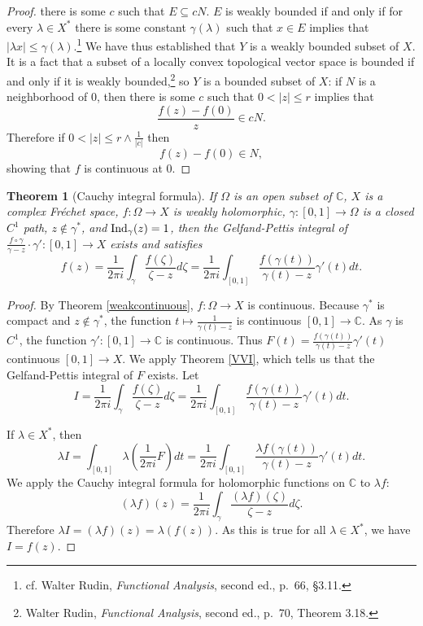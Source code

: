 \documentclass{article}
\newcommand{\Ind}{\ensuremath\mathrm{Ind}}
\newtheorem{theorem}{Theorem}
\theoremstyle{definition}
\begin{document}
\begin{proof}
there is some $c$ such that $E \subseteq cN$. $E$ is weakly bounded if and only if
for every $\lambda \in X^*$ there is some constant $\gamma(\lambda)$ such that $x \in E$ implies that 
$|\lambda x| \leq \gamma(\lambda)$.\footnote{cf. Walter Rudin, {\em Functional Analysis}, second ed., p.~66, \S 3.11.}
We have thus established that $Y$ is a weakly bounded subset of $X$. It is a fact that a subset of a locally convex topological vector space is bounded if and only if it is weakly
bounded,\footnote{Walter Rudin, {\em Functional Analysis}, second ed., p.~70, Theorem 3.18.} so
$Y$ is a bounded subset of $X$: if $N$ is a neighborhood of $0$, then there is some  $c$ such that
$0<|z| \leq r$ implies that
\[
\frac{f(z)-f(0)}{z} \in cN.
\]
Therefore if $0<|z| \leq r \wedge \frac{1}{|c|}$ then
\[
f(z)-f(0) \in N,
\]
showing that $f$ is continuous at $0$.
\end{proof}


\begin{theorem}[Cauchy integral formula]
If $\Omega$ is an open subset of $\mathbb{C}$, $X$ is a complex Fr\'echet space, 
$f:\Omega \to X$ is weakly holomorphic,  $\gamma:[0,1] \to \Omega$ is a closed $C^1$ path, $z \not \in
\gamma^*$, and  $\Ind_\gamma(z)=1$,
then the Gelfand-Pettis integral of $\frac{f \circ \gamma}{\gamma-z}\cdot \gamma':[0,1] \to X$ exists and satisfies
\[
f(z) =
 \frac{1}{2\pi i} \int_\gamma \frac{f(\zeta)}{\zeta-z} d\zeta
=
\frac{1}{2\pi i} \int_{[0,1]} \frac{f(\gamma(t))}{\gamma(t)-z} \gamma'(t) dt.
\]
\end{theorem}
\begin{proof}
By Theorem \ref{weakcontinuous}, $f:\Omega \to X$ is continuous. Because $\gamma^*$ is compact and $z \not \in
\gamma^*$, the function $t \mapsto \frac{1}{\gamma(t)-z}$ is continuous $[0,1] \to \mathbb{C}$. As $\gamma$ is $C^1$, 
the function $\gamma':[0,1] \to \mathbb{C}$ is continuous. Thus
$F(t)= \frac{f(\gamma(t))}{\gamma(t)-z} \gamma'(t)$
 continuous $[0,1] \to X$. We apply 
Theorem \ref{VVI}, which tells us that the Gelfand-Pettis integral of $F$ exists. Let
\[
I = 
 \frac{1}{2\pi i} \int_\gamma \frac{f(\zeta)}{\zeta-z} d\zeta
 =
\frac{1}{2\pi i} \int_{[0,1]} \frac{f(\gamma(t))}{\gamma(t)-z} \gamma'(t) dt.
\]

If $\lambda \in X^*$, then 
\[
\lambda I= \int_{[0,1]} \lambda\left( \frac{1}{2\pi i} F\right) dt
=\frac{1}{2\pi i} \int_{[0,1]} \frac{\lambda f(\gamma(t))}{\gamma(t)-z} \gamma'(t) dt.
\]
We apply the Cauchy integral formula for holomorphic functions on $\mathbb{C}$ to $\lambda f$:
\[
(\lambda f)(z) = \frac{1}{2\pi i} \int_\gamma \frac{(\lambda f)(\zeta)}{\zeta-z} d\zeta.
\]
Therefore $\lambda I =(\lambda f)(z)= \lambda (f(z))$. As this is true for all $\lambda \in X^*$, we have $I = f(z)$. 
\end{proof}
\end{document}
